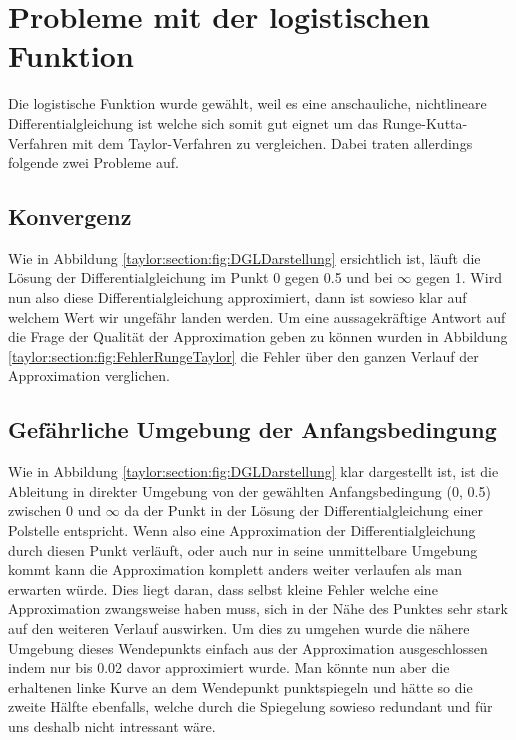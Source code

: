 \section{Probleme mit der logistischen Funktion}
\label{taylor:subsection:Probleme}
Die logistische Funktion wurde gewählt, weil es eine anschauliche, nichtlineare Differentialgleichung ist welche sich somit gut eignet um das Runge-Kutta-Verfahren mit dem Taylor-Verfahren zu vergleichen.
Dabei traten allerdings folgende zwei Probleme auf.

\subsection{Konvergenz
\label{taylor:subsection:Konvergenz}}
%
Wie in Abbildung 
\ref{taylor:section:fig:DGLDarstellung}
ersichtlich ist, läuft die Lösung der Differentialgleichung im Punkt 0 gegen 0.5 und bei $\infty$ gegen 1.
Wird nun also diese Differentialgleichung approximiert, dann ist sowieso klar auf welchem Wert wir ungefähr landen werden.
Um eine aussagekräftige Antwort auf die Frage der Qualität der Approximation geben zu können wurden in Abbildung \ref{taylor:section:fig:FehlerRungeTaylor} die Fehler über den ganzen Verlauf der Approximation verglichen.

\subsection{Gefährliche Umgebung der Anfangsbedingung
\label{taylor:subsection:0Punkt}}
Wie in Abbildung 
\ref{taylor:section:fig:DGLDarstellung}
klar dargestellt ist, ist die Ableitung in direkter Umgebung von der gewählten Anfangsbedingung (0, 0.5) zwischen 0 und $\infty$ da der Punkt in der Lösung der Differentialgleichung einer Polstelle entspricht.
Wenn also eine Approximation der Differentialgleichung durch diesen Punkt verläuft, oder auch nur in seine unmittelbare Umgebung kommt kann die Approximation komplett anders weiter verlaufen als man erwarten würde.
Dies liegt daran, dass selbst kleine Fehler welche eine Approximation zwangsweise haben muss, sich in der Nähe des Punktes sehr stark auf den weiteren Verlauf auswirken.
Um dies zu umgehen wurde die nähere Umgebung dieses Wendepunkts einfach aus der Approximation ausgeschlossen indem nur bis 0.02 davor approximiert wurde.
Man könnte nun aber die erhaltenen linke Kurve an dem Wendepunkt punktspiegeln und hätte so die zweite Hälfte ebenfalls, welche durch die Spiegelung sowieso redundant und für uns deshalb nicht intressant wäre.




